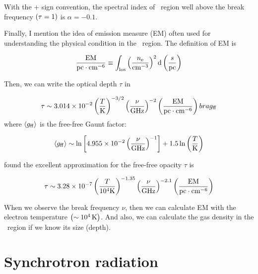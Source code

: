 With the $+$ sign convention, the spectral index of \ih~region well above the break frequency $\left(\tau=1\right)$ is $\alpha=-0.1$.\\ \vspace{0.2cm}

Finally, I mention the idea of emission measure (EM) often used for understanding the physical condition in the \ih~region.
The definition of EM is

\begin{equation}\label{eq:essential_radio4n57}
    \frac{\mathrm{EM}}{\mathrm{pc} \cdot \mathrm{cm}^{-6}} \equiv \int_{\mathrm{los}}\left(\frac{n_{\mathrm{e}}}{\mathrm{cm}^{-3}}\right)^2 \mathrm{d}\left(\frac{s}{\mathrm{pc}}\right)
\end{equation}

Then, we can write the optical depth $\tau$ in

\begin{equation}\label{eq:essential_radio4n58}
    \tau \sim 3.014 \times 10^{-2}\left(\frac{T}{\mathrm{K}}\right)^{-3/2}\left(\frac{\nu}{\mathrm{GHz}}\right)^{-2}\left(\frac{\mathrm{EM}}{\mathrm{pc} \cdot \mathrm{cm}^{-6}}\right)\\bra{g_{\mathrm{ff}}}
\end{equation}
where $\left\langle g_{\mathrm{ff}}\right\rangle$ is the free-free Gaunt factor:

\begin{equation}\label{eq:essential_radio4n59}
    \left\langle g_{\mathrm{ff}}\right\rangle \sim \ln \left[4.955 \times 10^{-2}\left(\frac{\nu}{\mathrm{GHz}}\right)^{-1}\right]+1.5 \ln \left(\frac{T}{\mathrm{K}}\right)
\end{equation}

\citet{Mezger1967} found the excellent approximation for the free-free opacity $\tau$ is

\begin{equation}\label{eq:essential_radio4n60}
    \tau \sim 3.28 \times 10^{-7}\left(\frac{T}{10^4 \mathrm{K}}\right)^{-1.35}\left(\frac{\nu}{\mathrm{GHz}}\right)^{-2.1}\left(\frac{\mathrm{EM}}{\mathrm{pc} \cdot \mathrm{cm}^{-6}}\right)
\end{equation}

When we observe the break frequency $\nu$, then we can calculate EM with the electron temperature $\left(\sim10^4\,\mathrm{K}\right)$.
And also, we can calculate the gas density in the \ih~region if we know its size (depth).





\section{Synchrotron radiation}\label{sec:synchrotronradiation}

